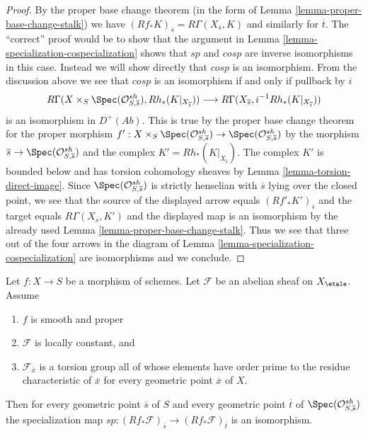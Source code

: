 \begin{proof}
By the proper base change theorem (in the form of
Lemma \ref{lemma-proper-base-change-stalk}) we have
$(Rf_*K)_{\overline{s}} = R\Gamma(X_{\overline{s}}, K)$
and similarly for $\overline{t}$. The ``correct'' proof would be
to show that the argument in
Lemma \ref{lemma-specialization-cospecialization}
shows that $sp$ and $cosp$ are inverse isomorphisms in this case.
Instead we will show directly that $cosp$ is an isomorphism.
From the discussion above we see that $cosp$ is an isomorphism
if and only if pullback by $i$
$$
R\Gamma(X \times_S \Spec(\mathcal{O}^{sh}_{S, \overline{s}}),
Rh_*(K|_{X_{\overline{t}}}))
\longrightarrow
R\Gamma(X_{\overline{s}}, i^{-1}Rh_*(K|_{X_{\overline{t}}}))
$$
is an isomorphism in $D^+(\textit{Ab})$. This is true by the proper
base change theorem for the proper morphism
$f' : X \times_S \Spec(\mathcal{O}^{sh}_{S, \overline{s}}) \to
\Spec(\mathcal{O}^{sh}_{S, \overline{s}})$
by the morphism $\overline{s} \to \Spec(\mathcal{O}^{sh}_{S, \overline{s}})$
and the complex $K' = Rh_*(K|_{X_{\overline{t}}})$. The complex
$K'$ is bounded below and has torsion cohomology sheaves
by Lemma \ref{lemma-torsion-direct-image}.
Since $\Spec(\mathcal{O}^{sh}_{S, \overline{s}})$ is strictly henselian
with $\overline{s}$ lying over the closed point,
we see that the source of the displayed arrow equals
$(Rf'_*K')_{\overline{s}}$ and the target equals
$R\Gamma(X_{\overline{s}}, K')$ and the displayed map is an isomorphism
by the already used
Lemma \ref{lemma-proper-base-change-stalk}.
Thus we see that three out of the four arrows in the diagram
of Lemma \ref{lemma-specialization-cospecialization} are isomorphisms
and we conclude.
\end{proof}

\begin{lemma}
\label{lemma-sp-isom-proper-loc-cst-torsion}
Let $f : X \to S$ be a morphism of schemes. Let $\mathcal{F}$
be an abelian sheaf on $X_\etale$. Assume
\begin{enumerate}
\item $f$ is smooth and proper
\item $\mathcal{F}$ is locally constant, and
\item $\mathcal{F}_{\overline{x}}$ is a torsion group all of
whose elements have order prime to the residue characteristic of
$\overline{x}$ for every geometric point $\overline{x}$ of $X$.
\end{enumerate}
Then for every geometric point $\overline{s}$ of $S$ and every geometric
point $\overline{t}$ of $\Spec(\mathcal{O}^{sh}_{S, \overline{s}})$
the specialization map
$sp : (Rf_*\mathcal{F})_{\overline{s}} \to (Rf_*\mathcal{F})_{\overline{t}}$
is an isomorphism.
\end{lemma}

